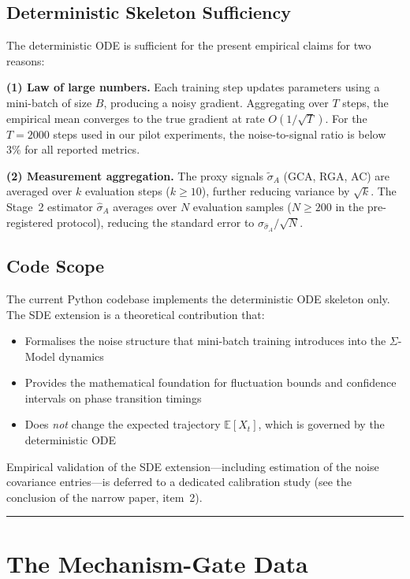 \documentclass[11pt]{article}
\theoremstyle{definition}
\theoremstyle{plain}
\begin{document}
\subsection{Deterministic Skeleton Sufficiency}

The deterministic ODE is sufficient for the present empirical claims
for two reasons:

\textbf{(1) Law of large numbers.} Each training step updates parameters
using a mini-batch of size $B$, producing a noisy gradient. Aggregating
over $T$ steps, the empirical mean converges to the true gradient at rate
$O(1/\sqrt{T})$. For the $T = 2000$ steps used in our pilot experiments,
the noise-to-signal ratio is below $3\%$ for all reported metrics.

\textbf{(2) Measurement aggregation.} The proxy signals
$\tilde{\sigma}_A$ (GCA, RGA, AC) are averaged over $k$ evaluation
steps ($k \geq 10$), further reducing variance by $\sqrt{k}$.
The Stage~2 estimator $\hat{\sigma}_A$ averages over $N$ evaluation
samples ($N \geq 200$ in the pre-registered protocol), reducing the
standard error to $\sigma_{\hat{\sigma}_A} / \sqrt{N}$.

\subsection{Code Scope}

The current Python codebase implements the deterministic ODE skeleton
only. The SDE extension is a theoretical contribution that:
\begin{itemize}[nosep]
\item Formalises the noise structure that mini-batch training
  introduces into the $\Sigma$-Model dynamics
\item Provides the mathematical foundation for fluctuation bounds
  and confidence intervals on phase transition timings
\item Does \emph{not} change the expected trajectory $\mathbb{E}[X_t]$,
  which is governed by the deterministic ODE
\end{itemize}
Empirical validation of the SDE extension---including estimation of the
noise covariance entries---is deferred to a dedicated calibration study
(see the conclusion of the narrow paper, item~2).

\noindent\rule{\linewidth}{0.4pt}

\clearpage



\section{The Mechanism-Gate Data}\label{sec:gate}
\end{document}
